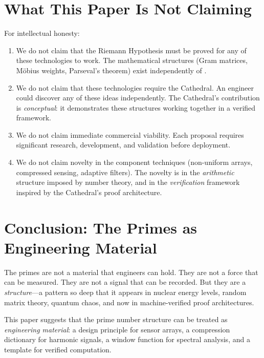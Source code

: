 \documentclass[11pt,a4paper]{article}
\begin{document}
\section{What This Paper Is Not Claiming}
\label{sec:disclaimer}

For intellectual honesty:

\begin{enumerate}
  \item We do not claim that the Riemann Hypothesis must be proved
    for any of these technologies to work. The mathematical
    structures (Gram matrices, M\"obius weights, Parseval's theorem)
    exist independently of \RH.
  \item We do not claim that these technologies require the
    Cathedral. An engineer could discover any of these ideas
    independently. The Cathedral's contribution is
    \emph{conceptual}: it demonstrates these structures working
    together in a verified framework.
  \item We do not claim immediate commercial viability. Each
    proposal requires significant research, development, and
    validation before deployment.
  \item We do not claim novelty in the component techniques
    (non-uniform arrays, compressed sensing, adaptive filters).
    The novelty is in the \emph{arithmetic} structure imposed by
    number theory, and in the \emph{verification} framework
    inspired by the Cathedral's proof architecture.
\end{enumerate}

\section{Conclusion: The Primes as Engineering Material}

The primes are not a material that engineers can hold. They are not
a force that can be measured. They are not a signal that can be
recorded. But they are a \emph{structure}---a pattern so deep that
it appears in nuclear energy levels, random matrix theory, quantum
chaos, and now in machine-verified proof architectures.

This paper suggests that the prime number structure can be treated
as \emph{engineering material}: a design principle for sensor
arrays, a compression dictionary for harmonic signals, a window
function for spectral analysis, and a template for verified
computation.
\end{document}
